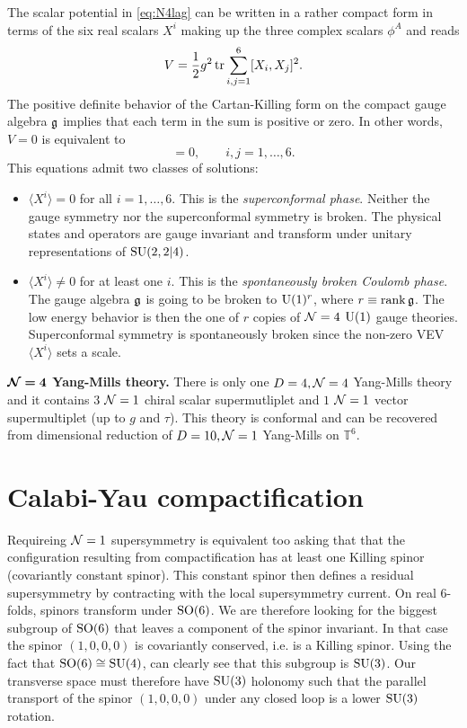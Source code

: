 \documentclass[a4paper,11pt]{article}
\begin{document}
        The scalar potential in \eqref{eq:N4lag} can be written in a rather compact form in terms of the six real scalars $X^i$ making up the three complex scalars $\phi^A$ and reads
        \begin{equation}
            V = \frac{1}{2}g^2\tr\sum^6_{i,j=1}[X_i,X_j]^2.
        \end{equation}
        The positive definite behavior of the Cartan-Killing form on the compact gauge algebra $\mathfrak{g}$ implies that each term in the sum is positive or zero. In other words, $V=0$ is equivalent to
        \begin{equation}
            [X^i,X^j]=0,\qquad i,j=1,\dots,6.
        \end{equation}
        This equations admit two classes of solutions:
        \begin{itemize}
            \item $\langle X^i\rangle=0$ for all $i=1,\dots,6$. This is the \emph{superconformal phase}. Neither the gauge symmetry nor the superconformal symmetry is broken. The physical states and operators are gauge invariant and transform under
            unitary representations of $\text{SU}(2,2|4)$.
            \item  $\langle X^i\rangle\neq0$ for at least one $i$. This is the \emph{spontaneously broken Coulomb phase}. The gauge algebra $\mathfrak{g}$ is going to be broken to $\text{U}(1)^r$, where $r\equiv\rank\mathfrak{g}$. The low energy behavior is then the one of $r$ copies of $\mathcal{N}=4$ $\text{U}(1)$ gauge theories. Superconformal symmetry is spontaneously broken since the non-zero VEV $\langle X^i\rangle$ sets a scale.
        \end{itemize}

        \begin{result}
            \textbf{$\boldsymbol{\mathcal{N}=4}$ Yang-Mills theory.} There is only one $D=4,\mathcal{N}=4$ Yang-Mills theory and it contains $3$ $\mathcal{N}=1$ chiral scalar supermutliplet and $1$ $\mathcal{N}=1$ vector supermultiplet (up to $g$ and $\tau$). This theory is conformal and can be recovered from dimensional reduction of $D=10,\mathcal{N}=1$ Yang-Mills on $\mathbb{T}^6$.
        \end{result}

\section{Calabi-Yau compactification}\label{sec:appCY}

    Requireing $\mathcal{N}=1$ supersymmetry is equivalent too asking that that the configuration resulting from compactification has at least one Killing spinor (covariantly constant spinor). This constant spinor then defines a residual supersymmetry by contracting with the local supersymmetry current. On real $6$-folds, spinors transform under $\text{SO}(6)$. We are therefore looking for the biggest subgroup of $\text{SO}(6)$ that leaves a component of the spinor invariant. In that case the spinor $(1,0,0,0)$ is covariantly conserved, i.e. is a Killing spinor. Using the fact that $\text{SO}(6)\cong\text{SU}(4)$, can clearly see that this subgroup is $\text{SU}(3)$. Our transverse space must therefore have $\text{SU}(3)$ holonomy such that the parallel transport of the spinor $(1,0,0,0)$ under any closed loop is a lower $\text{SU}(3)$ rotation.
\end{document}
